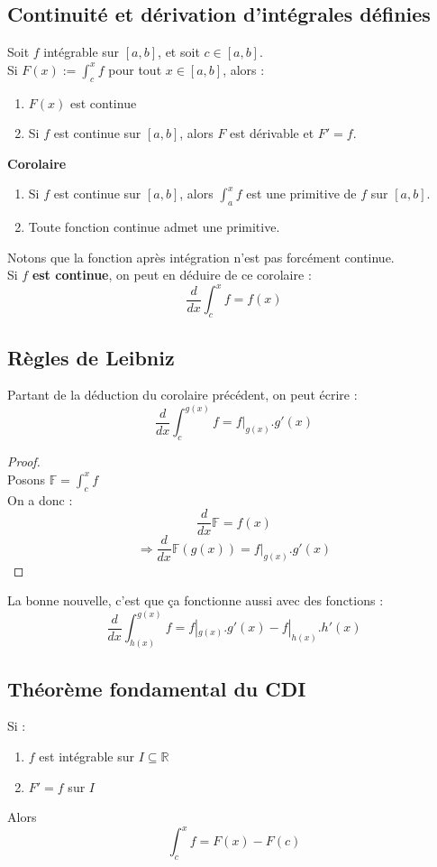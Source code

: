 \documentclass	[11pt, a4paper, openany]{book}
\begin{document}
\subsection{Continuité et dérivation d'intégrales définies}
Soit $f$ intégrable sur $[a,b]$, et soit $c \in [a,b]$.\\
Si $F(x) := \int_c^x f$ pour tout $x \in [a,b]$, alors :
\begin{enumerate}
\item $F(x)$ est continue
\item Si $f$ est continue sur $[a,b]$, alors $F$ est dérivable et $F' = f$.
\end{enumerate}
\textbf{Corolaire}
\begin{enumerate}
\item Si $f$ est continue sur $[a,b]$, alors $\int_a^x f$ est une primitive de $f$ sur $[a,b]$.
\item Toute fonction continue admet une primitive.
\end{enumerate}
Notons que la fonction après intégration n'est pas forcément continue.\\

Si $f$ \textbf{est continue}, on peut en déduire de ce corolaire : 
$$\frac{d}{dx}\int_c^x f = f(x)$$

\subsection{Règles de Leibniz}
Partant de la déduction du corolaire précédent, on peut écrire : 
$$\frac{d}{dx}\int_c^{g(x)} f = f|_{g(x)}.g'(x)$$

\begin{proof}
\ \\ Posons $\mathbb{F} = \int_c^x f$\\
On a donc : 
$$\frac{d}{dx}\mathbb{F} = f(x)$$
$$\Rightarrow \frac{d}{dx}\mathbb{F}(g(x)) = f|_{g(x)}.g'(x)$$
\end{proof}
La bonne nouvelle, c'est que ça fonctionne aussi avec des fonctions : 
$$\frac{d}{dx}\int_{h(x)}^{g(x)} f = f|_{g(x)}.g'(x) - f|_{h(x)}.h'(x)$$

\subsection{Théorème fondamental du CDI}
Si : 
\begin{enumerate}
\item $f$ est intégrable sur $I \subseteq \mathbb{R}$
\item $F' = f$ sur $I$
\end{enumerate}
Alors 
$$\int^x_c f = F(x) - F(c)$$
\end{document}
